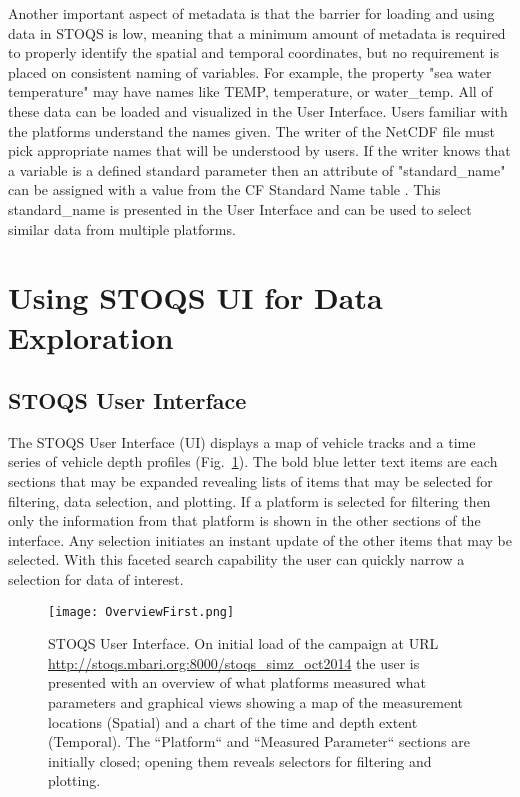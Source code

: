 \documentclass[conference]{IEEEtran}
\begin{document}
Another important aspect of metadata is that the barrier for loading and using data in 
STOQS is low, meaning that a minimum amount of metadata is required to properly 
identify the spatial and temporal coordinates, but no requirement is placed on 
consistent naming of variables. For example, the property "sea water temperature" may 
have names like TEMP, temperature, or water\_temp. All of these data can be loaded and 
visualized in the User Interface. Users familiar with the platforms understand the names 
given. The writer of the NetCDF file must pick appropriate names that will be understood 
by users. If the writer knows that a variable is a defined standard parameter then an 
attribute of "standard\_name" can be assigned with a value from the CF Standard Name 
table \cite{CFSN}. This standard\_name is presented in the User Interface and can be 
used to select similar data from multiple platforms.

\section{Using STOQS UI for Data Exploration}

\subsection{STOQS User Interface}

The STOQS User Interface (UI) displays a map of vehicle tracks and a time series of 
vehicle depth profiles (Fig.~\ref{fig:OverviewFirst}). The bold blue letter text 
items are each sections that may be expanded revealing lists of items that may be 
selected for filtering, data selection, and plotting. If a platform is selected for 
filtering then only the information from that platform is shown in the other sections 
of the interface. Any selection initiates an instant update of the other items that 
may be selected. With this faceted search capability the user can quickly narrow a 
selection for data of interest. 

\begin{figure}[htbp]
\centering
\texttt{[image: OverviewFirst.png]}
\caption{STOQS User Interface. On initial load of the campaign at URL 
\url{http://stoqs.mbari.org:8000/stoqs_simz_oct2014} the user is presented 
with an overview of what platforms measured what parameters and graphical views showing 
a  map of the measurement locations (Spatial) and a chart of the time and depth extent (Temporal).
The ``Platform`` and ``Measured Parameter`` sections are initially closed; opening them 
reveals selectors for filtering and plotting.}
\label{fig:OverviewFirst}
\end{figure}
\end{document}
